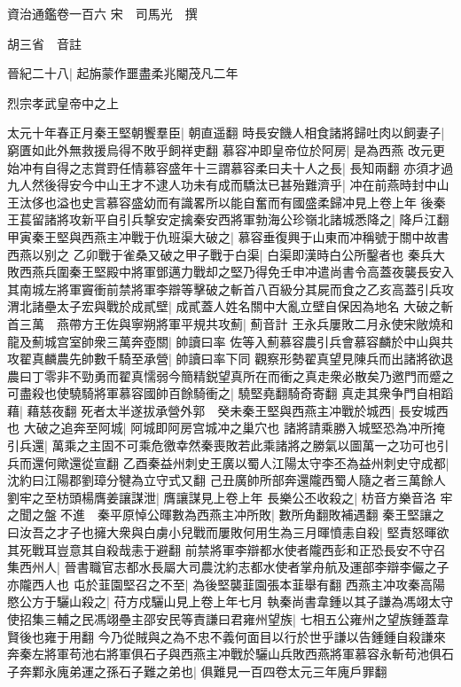 資治通鑑卷一百六
宋　司馬光　撰

胡三省　音註

晉紀二十八|{
	起旃蒙作噩盡柔兆閹茂凡二年}


烈宗孝武皇帝中之上

太元十年春正月秦王堅朝饗羣臣|{
	朝直遥翻}
時長安饑人相食諸將歸吐肉以飼妻子|{
	窮匱如此外無救援烏得不敗乎飼祥吏翻}
慕容冲即皇帝位於阿房|{
	是為西燕}
改元更始冲有自得之志賞罸任情慕容盛年十三謂慕容柔曰夫十人之長|{
	長知兩翻}
亦須才過九人然後得安今中山王才不逮人功未有成而驕汰已甚殆難濟乎|{
	冲在前燕時封中山王汰侈也溢也史言慕容盛幼而有識畧所以能自奮而有國盛柔歸冲見上卷上年}
後秦王萇留諸將攻新平自引兵撃安定擒秦安西將軍勃海公珍嶺北諸城悉降之|{
	降戶江翻}
甲寅秦王堅與西燕主冲戰于仇班渠大破之|{
	慕容垂復興于山東而冲稱號于關中故書西燕以别之}
乙卯戰于雀桑又破之甲子戰于白渠|{
	白渠即漢時白公所鑿者也}
秦兵大敗西燕兵圍秦王堅殿中將軍鄧邁力戰却之堅乃得免壬申冲遣尚書令高蓋夜襲長安入其南城左將軍竇衝前禁將軍李辯等擊破之斬首八百級分其屍而食之乙亥高蓋引兵攻渭北諸壘太子宏與戰於成貳壁|{
	成貳蓋人姓名關中大亂立壁自保因為地名}
大破之斬首三萬　燕帶方王佐與寧朔將軍平規共攻薊|{
	薊音計}
王永兵屢敗二月永使宋敞燒和龍及薊城宫室帥衆三萬奔壺關|{
	帥讀曰率}
佐等入薊慕容農引兵會慕容麟於中山與共攻翟真麟農先帥數千騎至承營|{
	帥讀曰率下同}
觀察形勢翟真望見陳兵而出諸將欲退農曰丁零非不勁勇而翟真懦弱今簡精鋭望真所在而衝之真走衆必散矣乃邀門而蹙之可盡殺也使驍騎將軍慕容國帥百餘騎衝之|{
	驍堅堯翻騎奇寄翻}
真走其衆争門自相蹈藉|{
	藉慈夜翻}
死者太半遂拔承營外郭　癸未秦王堅與西燕主冲戰於城西|{
	長安城西也}
大破之追奔至阿城|{
	阿城即阿房宫城冲之巢穴也}
諸將請乘勝入城堅恐為冲所掩引兵還|{
	萬乘之主固不可乘危徼幸然秦喪敗若此乘諸將之勝氣以圖萬一之功可也引兵而還何歟還從宣翻}
乙酉秦益州刺史王廣以蜀人江陽太守李丕為益州刺史守成都|{
	沈約曰江陽郡劉璋分犍為立守式又翻}
己丑廣帥所部奔還隴西蜀人隨之者三萬餘人　劉牢之至枋頭楊膺姜讓謀泄|{
	膺讓謀見上卷上年}
長樂公丕收殺之|{
	枋音方樂音洛}
牢之聞之盤不進　秦平原悼公暉數為西燕主冲所敗|{
	數所角翻敗補遇翻}
秦王堅讓之曰汝吾之才子也擁大衆與白虜小兒戰而屢敗何用生為三月暉憤恚自殺|{
	堅責怒暉欲其死戰耳豈意其自殺哉恚于避翻}
前禁將軍李辯都水使者隴西彭和正恐長安不守召集西州人|{
	晉書職官志都水長屬大司農沈約志都水使者掌舟航及運部李辯李儼之子亦隴西人也}
屯於韮園堅召之不至|{
	為後堅襲韮園張本韮舉有翻}
西燕主冲攻秦高陽愍公方于驪山殺之|{
	苻方戍驪山見上卷上年七月}
執秦尚書韋鍾以其子謙為馮翊太守使招集三輔之民馮翊壘主邵安民等責謙曰君雍州望族|{
	七相五公雍州之望族鍾蓋韋賢後也雍于用翻}
今乃從賊與之為不忠不義何面目以行於世乎謙以告鍾鍾自殺謙來奔秦左將軍苟池右將軍俱石子與西燕主冲戰於驪山兵敗西燕將軍慕容永斬苟池俱石子奔鄴永廆弟運之孫石子難之弟也|{
	俱難見一百四卷太元三年廆戶罪翻}
